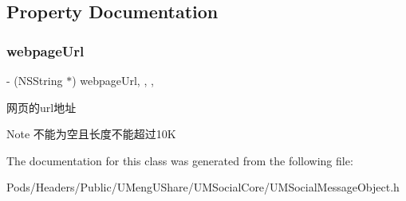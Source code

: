 \subsection{Property Documentation}
\mbox{\label{interface_u_m_share_webpage_object_adcb99eee3c1e05fa78a8e63af8d15eac}} 
\subsubsection{\texorpdfstring{webpage\+Url}{webpageUrl}}
{\footnotesize\ttfamily -\/ (N\+S\+String $\ast$) webpage\+Url\hspace{0.3cm}{\ttfamily [read]}, {\ttfamily [write]}, {\ttfamily [nonatomic]}, {\ttfamily [retain]}}

网页的url地址 \begin{DoxyNote}{Note}
不能为空且长度不能超过10K 
\end{DoxyNote}


The documentation for this class was generated from the following file\+:\begin{DoxyCompactItemize}
\item 
Pods/\+Headers/\+Public/\+U\+Meng\+U\+Share/\+U\+M\+Social\+Core/U\+M\+Social\+Message\+Object.\+h\end{DoxyCompactItemize}

